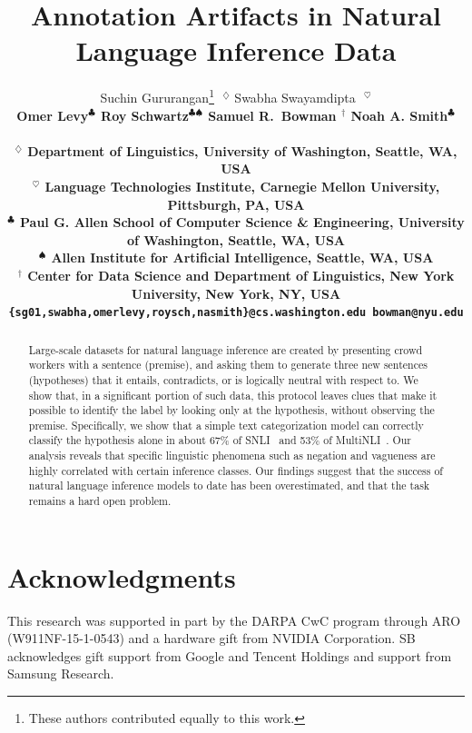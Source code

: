 \documentclass[11pt,a4paper]{article}
\title{Annotation Artifacts in Natural Language Inference Data}
\author{ 
    Suchin Gururangan\thanks{\quad These authors contributed equally to this work.}$~~~^{\diamondsuit}$ \quad
	Swabha Swayamdipta\samethanks $~~~^\heartsuit$  \\ 
	\bf Omer Levy$^\clubsuit$ \quad
	Roy Schwartz$^{\clubsuit\spadesuit}$ \quad
	Samuel R.~Bowman $^\dagger$ \quad
	Noah A. Smith$^\clubsuit$ \\\\
	$^\diamondsuit$ Department of Linguistics, University of Washington, Seattle, WA, USA \\
	$^\heartsuit$ Language Technologies Institute, Carnegie Mellon University, Pittsburgh, PA, USA \\
	$^\clubsuit$ Paul G. Allen School of Computer Science \& Engineering, University of Washington, Seattle, WA, USA \\
	$^\spadesuit$ Allen Institute for Artificial Intelligence, Seattle, WA, USA \\
    $^\dagger$ Center for Data Science and Department of Linguistics, New York University, New York, NY, USA \\
	{\tt \{sg01,swabha,omerlevy,roysch,nasmith\}@cs.washington.edu  bowman@nyu.edu}
}
\date{}
\newcommand{\roy}[1]{\draftcomment{red}{roy}{#1}}
\newcommand{\suchin}[1]{\draftcomment{maroon}{suchin}{#1}}
\newcommand{\nascomment}[1]{\draftcomment{olive}{nas}{#1}}
\newcommand{\resolved}[1]{}
\begin{document}
\maketitle

\resolved{\nascomment{I commented out the change to a command above, so that there would be an oxford comma. should Suchin's affiliation be UW Linguistics?  another suggested change, assuming we get 5 pages for camera ready, is to make the font in tables normal size instead of small or tiny} 
\suchin{\resolved{Yep should be linguistics! }I increased the size of the last table, but the other tables overshoot the column margins when they are normal sized. Not sure how to prevent this.}}
\resolved{\roy{any idea if we are allowed to push the text down to create a gap between affiliations and text? Alternatively, ideas on how to make the affiliations take up less space?}}
\begin{abstract}
Large-scale datasets for natural language inference are created by presenting crowd workers with a sentence (premise), and asking them to generate three new sentences (hypotheses) that it entails, contradicts, or is logically neutral with respect to. 
We show that, in a significant portion of such data, this protocol leaves clues that make it possible to identify the label by looking only at the hypothesis, without observing the premise. 
Specifically, we show that a simple text categorization model can correctly classify the hypothesis alone in about 67\% of SNLI~\cite{Bowman:2015} and 53\% of MultiNLI~\cite{Williams:2017}. 
Our analysis reveals that specific linguistic phenomena such as negation and vagueness are highly correlated with certain inference classes. 
Our findings suggest that the success of natural language inference models to date has been overestimated, and that the task remains a hard open problem. 

\end{abstract}










% 



\section*{Acknowledgments}
This research was supported in part by 
the DARPA CwC program through ARO (W911NF-15-1-0543)
and a hardware gift from NVIDIA Corporation.
SB acknowledges gift support from Google and Tencent Holdings and support from Samsung Research.



\end{document}

